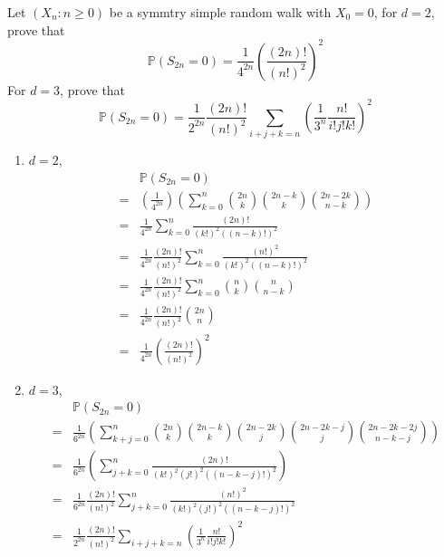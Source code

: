 \documentclass{ctexart}
\begin{document}
\begin{problem}\label{pro:3}
  Let \((X_n:n \geq 0)\) be a symmtry simple random walk with \(X_0=0\), for \(d=2\), prove that
  \[
    \mathbb{P}(S_{2n}=0)=\frac{1}{4^{2n}}\left(\frac{(2n)!}{(n!)^2}\right)^2
  \]
  For \(d=3\), prove that
  \[
    \mathbb{P}(S_{2n}=0)=\frac{1}{2^{2n}}\frac{(2n)!}{(n!)^2}\sum_{i + j + k = n} \left(\frac{1}{3^n}\frac{n!}{i!j!k!}\right)^2
  \]
\end{problem}
\begin{solution}
  \begin{enumerate}
    \item \(d = 2\),
      \begin{equation}
        \begin{aligned}
            & \mathbb{P}(S_{2n} = 0)                                                           \\
          = & (\frac{1}{4^{2n}})(\sum_{k=0}^n\binom{2n}{k}\binom{2n-k}{k}\binom{2n-2k}{n-k})   \\
          = & \frac{1}{4^{2n}}\sum_{k=0}^n \frac{(2n)!}{(k!)^2((n-k)!)^2}                      \\
          = & \frac{1}{4^{2n}} \frac{(2n)!}{(n!)^2}\sum_{k=0}^n\frac{(n!)^2}{(k!)^2((n-k)!)^2} \\
          = & \frac{1}{4^{2n}} \frac{(2n)!}{(n!)^2}\sum_{k=0}^n \binom{n}{k} \binom{n}{n-k}    \\
          = & \frac{1}{4^{2n}} \frac{(2n)!}{(n!)^2}\binom{2n}{n}                               \\
          = & \frac{1}{4^{2n}} (\frac{(2n)!}{(n!)^2})^2
        \end{aligned}
      \end{equation}
    \item \(d = 3\),
      \begin{equation}
        \begin{aligned}
            & \mathbb{P}(S_{2n}=0)                                                                                                       \\
          = & \frac{1}{6^{2n}}(\sum_{k+j=0}^n \binom{2n}{k} \binom{2n-k}{k} \binom{2n-2k}{j} \binom{2n-2k-j}{j} \binom{2n-2k-2j}{n-k-j}) \\
          = & \frac{1}{6^{2n}}(\sum_{j+k=0}^n \frac{(2n)!}{(k!)^2(j!)^2((n-k-j)!)^2})                                                    \\
          = & \frac{1}{6^{2n}} \frac{(2n)!}{(n!)^2} \sum_{j+k=0}^n \frac{(n!)^2}{(k!)^2(j!)^2((n-k-j)!)^2}                               \\
          = & \frac{1}{2^{2n}}\frac{(2n)!}{(n!)^2}\sum_{i + j + k = n} \left(\frac{1}{3^n}\frac{n!}{i!j!k!}\right)^2
        \end{aligned}
      \end{equation}

  \end{enumerate}

\end{solution}
\end{document}
